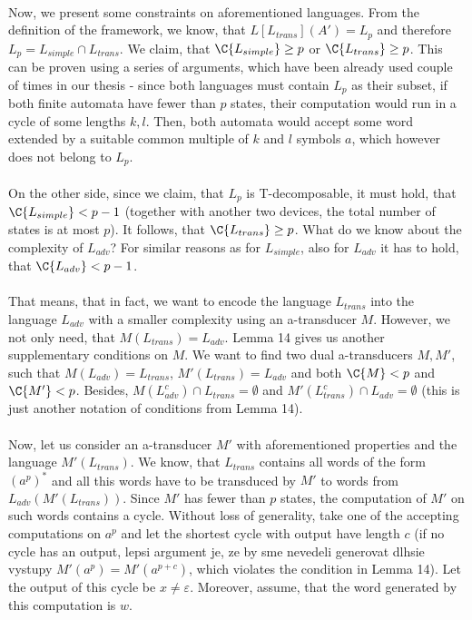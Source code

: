 \paragraph{}
Now, we present some constraints on aforementioned languages. From the definition of the framework, we know, that $L[L_{trans}](A') = L_p$ and therefore $L_p = L_{simple} \cap L_{trans}$. We claim, that $\C{L_{simple}} \geq p$ or $\C{L_{trans}} \geq p$. This can be proven using a series of arguments, which have been already used couple of times in our thesis - since both languages must contain $L_p$ as their subset, if both finite automata have fewer than $p$ states, their computation would run in a cycle of some lengths $k, l$. Then, both automata would accept some word extended by a suitable common multiple of $k$ and $l$ symbols $a$, which however does not belong to $L_p$.

\paragraph{}
On the other side, since we claim, that $L_p$ is T-decomposable, it must hold, that $\C{L_{simple}} \allowbreak < p-1$ (together with another two devices, the total number of states is at most $p$). It follows, that $\C{L_{trans}} \geq p$. What do we know about the complexity of $L_{adv}$? For similar reasons as for $L_{simple}$, also for $L_{adv}$ it has to hold, that $\C{L_{adv}} < p-1$.

\paragraph{}
That means, that in fact, we want to encode the language $L_{trans}$ into the language $L_{adv}$ with a smaller complexity using an a-transducer $M$. However, we not only need, that $M(L_{trans}) = L_{adv}$. Lemma 14 gives us another supplementary conditions on $M$. We want to find two dual a-transducers $M, M'$, such that $M(L_{adv}) = L_{trans}$, $M'(L_{trans}) = L_{adv}$ and both $\C{M} < p$ and $\C{M'} < p$. Besides, $M(L^c_{adv}) \cap L_{trans} = \emptyset$ and $M'(L^c_{trans}) \cap L_{adv} = \emptyset$ (this is just another notation of conditions from Lemma 14).

\paragraph{}
Now, let us consider an a-transducer $M'$ with aforementioned properties and the language $M'(L_{trans})$. We know, that $L_{trans}$ contains all words of the form $(a^p)^*$ and all this words have to be transduced by $M'$ to words from $L_{adv} (M'(L_{trans}))$. Since $M'$ has fewer than $p$ states, the computation of $M'$ on such words contains a cycle. Without loss of generality, take one of the accepting computations on $a^p$ and let the shortest cycle with output have length $c$ (if no cycle has an output, \color{red}lepsi argument je, ze by sme nevedeli generovat dlhsie vystupy\color{black} $M'(a^p) = M'(a^{p+c})$, which violates the condition in Lemma 14). Let the output of this cycle be $x \neq \varepsilon$. Moreover, assume, that the word generated by this computation is $w$.

